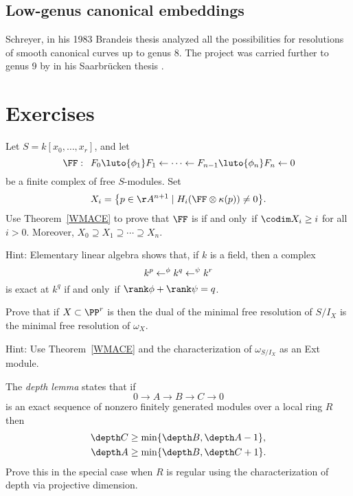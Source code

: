 \subsection*{Low-genus canonical embeddings}
Schreyer, in his 1983 Brandeis
thesis 
analyzed all the possibilities for reso\-lutions of smooth
canonical curves up to genus 8. The project was carried further to
genus 9 by 
in his Saarbr\"ucken thesis \citeyear{Sagraloff}  
.

\section{Exercises}

\begin{exercise}\label{WMACE corollary}
Let $S = k[x_0,\dots, x_r]$, and let
$$
\FF:\quad  
F_0\luto{\phi_1}F_1 \leftarrow \cdots \leftarrow F_{n-1}\luto{\phi_n} F_n\leftarrow 0
$$
be a finite complex of free $S$-modules. Set
$$
X_i =\big\{p\in \AA^{n+1} \mid  H_i(\FF \otimes \kappa(p)) \neq 0 \big\}.
$$
Use Theorem~\ref{WMACE} to prove that $\FF$ is 
%
if and only~if
$
\codim X_i \geq i
$
for all $i>0$. Moreover, $X_{0}\supseteq X_{1}\supseteq \cdots \supseteq
X_{n}$.

Hint: Elementary linear algebra shows that, if $k$ is a field, then a
complex $$k^p \lTo^{\phi} k^q \lTo^\psi k^r$$ is exact at $k^q$ if and
only~if $\rank \phi +\rank \psi = q$.
\end{exercise}

\begin{exercise}
Prove that if $X\subset \PP^r$ is 
%
then
the dual of the minimal free resolution of $S/I_X$
is the minimal free resolution of $\omega_X$.

Hint: Use Theorem~\ref{WMACE}
and the characterization of $\omega_{S/I_X}$
as an Ext module.
\end{exercise}

\begin{exercise}
The \emph{depth lemma} states that if
%
$$
0\to A\to B\to C \to 0
$$
is an exact sequence of nonzero finitely generated modules over a local
ring $R$ then
$$
\begin{aligned}
\depth C &\geq \min\{\depth B, \depth A-1\},\\
\depth A & \geq \min\{\depth B, \depth C +1\}.
\end{aligned}
$$
Prove this in the special case when $R$ is regular using the
characterization of depth
via projective dimension.
\end{exercise}

